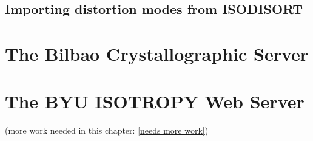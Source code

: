 \subsection{Importing distortion modes from ISODISORT}

\section{The Bilbao Crystallographic Server}\label{ref:BCS}

\section{The BYU ISOTROPY Web Server}\label{ref:isotropy}


(more work needed in this chapter: \ref{needs more work})